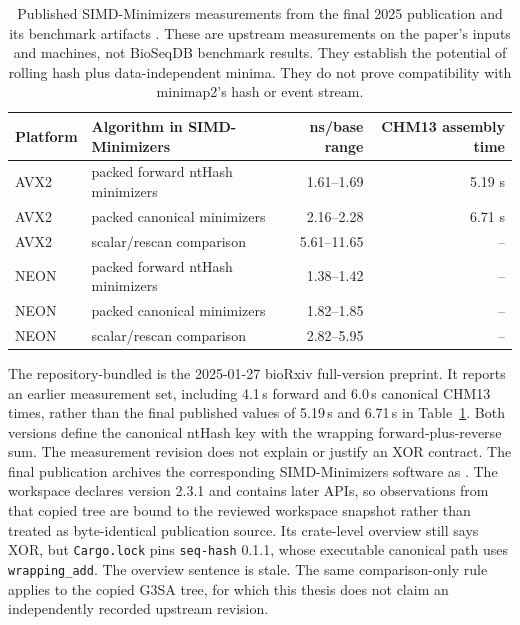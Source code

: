 \begin{table}[ht]
\centering
\small
\begin{tabular}{llrr}
\toprule
Platform & Algorithm in SIMD-Minimizers & ns/base range & CHM13 assembly time\\
\midrule
AVX2 & packed forward ntHash minimizers & 1.61--1.69 & 5.19 s\\
AVX2 & packed canonical minimizers & 2.16--2.28 & 6.71 s\\
AVX2 & scalar/rescan comparison & 5.61--11.65 & --\\
NEON & packed forward ntHash minimizers & 1.38--1.42 & --\\
NEON & packed canonical minimizers & 1.82--1.85 & --\\
NEON & scalar/rescan comparison & 2.82--5.95 & --\\
\bottomrule
\end{tabular}
\caption{Published SIMD-Minimizers measurements from the final 2025
publication and its benchmark artifacts
\cite{groot_koerkamp_simd_minimizers_2025}. These are upstream measurements on
the paper's inputs and machines, not BioSeqDB benchmark results. They establish
the potential of rolling hash plus data-independent minima. They do not prove
compatibility with minimap2's hash or event stream.}
\label{tab:upstream-simd-minimizers}
\end{table}

The repository-bundled
\allowbreak
{}\allowbreak
{} is the
2025-01-27 bioRxiv full-version preprint.  It reports an earlier measurement
set, including 4.1\,s forward and 6.0\,s canonical CHM13 times, rather than the
final published values of 5.19\,s and 6.71\,s in
Table~\ref{tab:upstream-simd-minimizers}.  Both versions define the
canonical ntHash key with the wrapping forward-plus-reverse sum.  The
measurement revision does not explain or justify an XOR contract.  The final
publication archives the corresponding SIMD-Minimizers software as
.  The workspace
 declares version 2.3.1 and contains later APIs,
so observations from that copied tree are bound to the reviewed workspace
snapshot rather than treated as byte-identical publication source.  Its
crate-level overview still says XOR, but \texttt{Cargo.lock} pins
\texttt{seq-hash} 0.1.1, whose executable canonical path uses
\texttt{wrapping\_add}.  The overview sentence is stale.  The same
comparison-only rule applies to the copied G3SA tree, for which this thesis
does not claim an independently recorded upstream revision.

